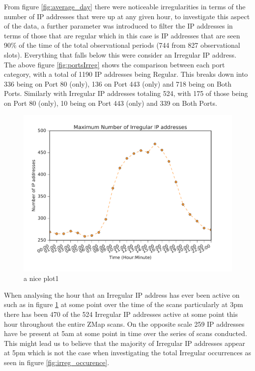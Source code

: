 \documentclass[a4wide,leqno,12pt]{report}
\begin{document}
From figure \ref{fig:average_day} there were noticeable irregularities in terms of the number of IP addresses that were up at any given hour, to investigate this aspect of the data, a further parameter was introduced to filter the IP addresses in terms of those that are regular which in this case is
IP addresses that are seen 90\% of the time of the total observational periods (744 from 827 observational slots). Everything that falls below this were consider an Irregular IP address.\\

The above figure \ref{fig:portsIrreg} shows the comparison between each port category, with a total of 1190 IP addresses being Regular. This breaks down into 336 being on Port 80 (only), 136 on Port 443 (only) and 718 being on Both Ports. Similarly with Irregular IP addresses totaling 524, with 175 of those being on Port 80 (only), 10 being on Port 443 (only) and 339 on Both Ports.

\begin{figure}[H]
\centering
\includegraphics[scale=.5]{pdf_images/MaximumNumberOfIrregularIPaddressesInAnAverageDay}
\caption{a nice plot1}
\label{fig:irreg_ips}
\end{figure}
When analysing the hour that an Irregular IP address has ever been active on such as in figure \ref{fig:irreg_ips} at some point over the time of the scans particularly at 3pm there has been 470 of the 524 Irregular IP addresses active at some point this hour throughout the entire ZMap scans. On the opposite scale 259 IP addresses have be present at 5am at some point in time over the series of scans conducted. This might lead us to believe that the majority of Irregular IP addresses appear at 5pm which is not the case when investigating the total Irregular occurrences as seen in figure \ref{fig:irreg_occurence}.
\end{document}
